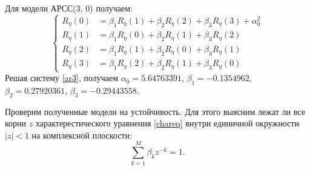\documentclass[12pt, fleqn]{article}
\begin{document}
{{		Для модели АРСС(3, 0) получаем:
		\begin{equation}\label{ar3}
			\left\{
			\begin{split}
				R_{\eta}(0) &= \beta_1 R_{\eta}(1) + \beta_2 R_{\eta}(2) + \beta_3 R_{\eta}(3) + \alpha^2_0 \\
				R_{\eta}(1) &= \beta_1 R_{\eta}(0) + \beta_2 R_{\eta}(1) + \beta_3 R_{\eta}(2) \\
				R_{\eta}(2) &= \beta_1 R_{\eta}(1) + \beta_2 R_{\eta}(0) + \beta_3 R_{\eta}(1) \\
				R_{\eta}(3) &= \beta_1 R_{\eta}(2) + \beta_2 R_{\eta}(1) + \beta_3 R_{\eta}(0)
			\end{split}
			\right.
		\end{equation}
		Решая систему \eqref{ar3}, получаем $\alpha_0 = 5.64763391$, $\beta_1 = -0.1354962$, $\beta_2 = 0.27920361$, $\beta_3 = -0.29443558$.\medskip 
										      
		Проверим полученные модели на устойчивость. Для этого выясним лежат ли все корни $z$ характерестического уравнения \eqref{chareq} внутри единичной окружности $ \left| z \right| < 1 $ на комплексной плоскости:
		\begin{equation}\label{chareq}
			\sum_{k=1}^M {\beta_k z^{-k}} = 1.
		\end{equation}\medskip 
										      

}}
\end{document}
